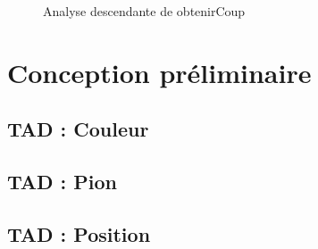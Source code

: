\documentclass{article}
\begin{document}
\begin{figure}[H]                                                                                                                                                                                             
    \caption{Analyse descendante de obtenirCoup}                                                                                                                          
    \label{un-identifiant}                                                                                                                                                                                 
\end{figure}       

\section{Conception préliminaire}

\subsection{TAD : Couleur}


\subsection{TAD : Pion}


\subsection{TAD : Position}

\end{document}

